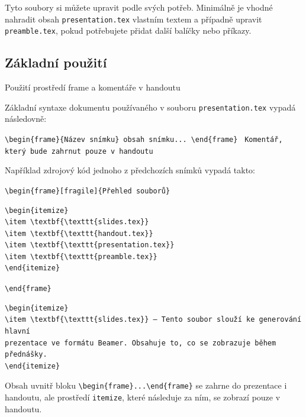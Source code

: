 Tyto soubory si můžete upravit podle svých potřeb. Minimálně je vhodné nahradit obsah \texttt{presentation.tex} vlastním textem a případně upravit \texttt{preamble.tex}, pokud potřebujete přidat další balíčky nebo příkazy.

\subsection{Základní použití}


\begin{frame}[fragile]{Použití prostředí frame a komentáře v handoutu}

\begin{block}{}
Základní syntaxe dokumentu používaného v souboru \verb|presentation.tex| vypadá následovně:
\end{block}

\begin{likeverbatim}\verb|\begin{frame}{Název snímku}|\
\verb|obsah snímku...|\
\verb|\end|\verb|{frame}|\
\vspace{1em}
\verb|Komentář, který bude zahrnut pouze v handoutu|
\end{likeverbatim}

\end{frame}

Například zdrojový kód jednoho z předchozích snímků vypadá takto:

\verb|\begin|\verb|{frame}[fragile]{Přehled souborů}|
\begin{verbatim}
\begin{itemize}
\item \textbf{\texttt{slides.tex}}
\item \textbf{\texttt{handout.tex}}
\item \textbf{\texttt{presentation.tex}}
\item \textbf{\texttt{preamble.tex}}
\end{itemize}
\end{verbatim}
\verb|\end|\verb|{frame}|

\begin{verbatim}
\begin{itemize}
\item \textbf{\texttt{slides.tex}} – Tento soubor slouží ke generování hlavní
prezentace ve formátu Beamer. Obsahuje to, co se zobrazuje během přednášky.
\end{itemize}
\end{verbatim}

Obsah uvnitř bloku \verb|\begin|\verb|{frame}...\end|\verb|{frame}| se zahrne
do prezentace i handoutu, ale prostředí \texttt{itemize}, které následuje za
ním, se zobrazí pouze v handoutu.

